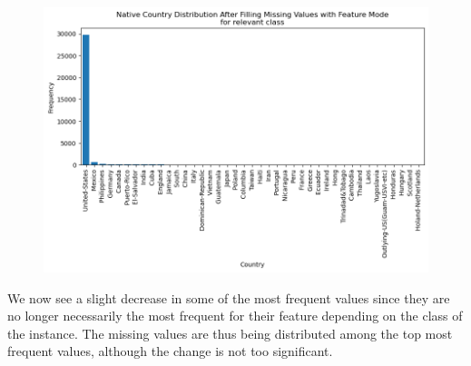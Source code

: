 \documentclass{article}
\begin{document}
    \begin{center}
        \begin{minipage}[t]{0.9\textwidth}
            \begin{figure}[H]
                \centering
                \includegraphics[width=1\textwidth, height=0.4\textheight]{./2_3ciii.png}
            \end{figure}
            We now see a slight decrease in some of the most frequent values since they
            are no longer necessarily the most frequent for their feature depending
            on the class of the instance. The missing values are thus being distributed
            among the top most frequent values, although the change is not too significant.
        \end{minipage}
    \end{center}
\end{document}
